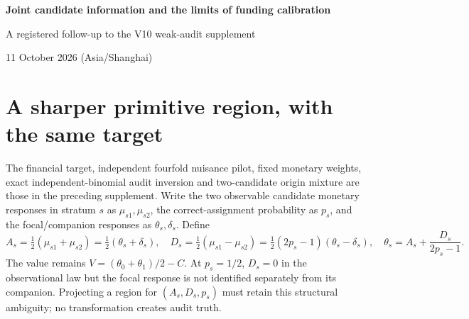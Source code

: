 \documentclass[11pt,a4paper]{article}
\begin{document}
\begin{center}
{\LARGE\bfseries Joint candidate information and the limits of funding calibration\par}
\vspace{4mm}
{\large A registered follow-up to the V10 weak-audit supplement\par}
11 October 2026 (Asia/Shanghai)\par
\end{center}
\begin{abstract}
The first weak-audit supplement retained rank ambiguity but produced broad
funding-value sets. This follow-up uses shared information in the two observed
candidate responses, forming average and difference scores before covariance
estimation. A repaired 3,600-request study finds narrower transformed sets in
all 2,937 paired finite cases of six selected designs, without a general
dominance theorem. Weak audit information remains the limiting factor: 558/600
near-rank outputs are whole-line; even with eight times as many audit labels,
105/600 are whole-line and the finite transformed median width is about
USD 15.4 million. A pathwise observational-equivalence construction shows that
false exogeneity cannot be solved by interval algebra alone. This is an
author-reviewed research follow-up, not a bank-calibrated product.
\end{abstract}

\section{A sharper primitive region, with the same target}

The financial target, independent fourfold nuisance pilot, fixed monetary
weights, exact independent-binomial audit inversion and two-candidate origin
mixture are those in the preceding supplement. Write the two observable
candidate monetary responses in stratum $s$ as $\mu_{s1},\mu_{s2}$, the
correct-assignment probability as $p_s$, and the focal/companion responses as
$\theta_s,\delta_s$. Define
\begin{equation}\label{eq:transform}
 A_s=\tfrac12(\mu_{s1}+\mu_{s2})=\tfrac12(\theta_s+\delta_s),\quad
 D_s=\tfrac12(\mu_{s1}-\mu_{s2})=
     \tfrac12(2p_s-1)(\theta_s-\delta_s),\quad
 \theta_s=A_s+\frac{D_s}{2p_s-1}.
\end{equation}
The value remains $V=(\theta_0+\theta_1)/2-C$. At $p_s=1/2$, $D_s=0$ in
the observational law but the focal response is not identified separately
from its companion. Projecting a region for $(A_s,D_s,p_s)$ must retain this
structural ambiguity; no transformation creates audit truth.
\end{document}
